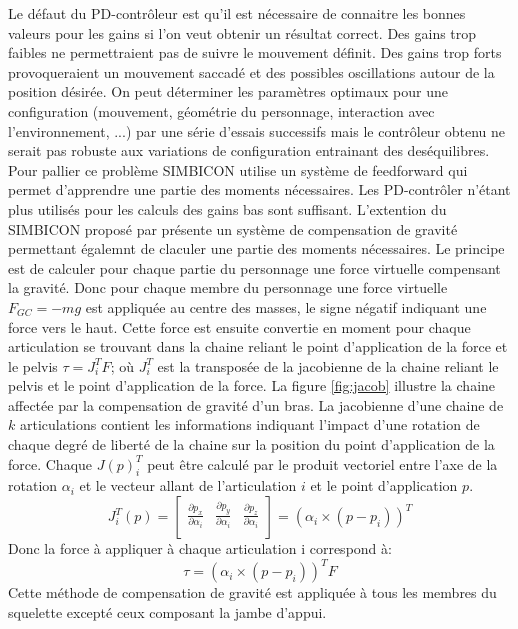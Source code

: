 \documentclass{llncs}
\begin{document}
Le défaut du PD-contrôleur est qu'il est nécessaire de connaitre les bonnes valeurs pour les gains si l'on veut obtenir un résultat correct. Des gains trop faibles ne permettraient pas de suivre le mouvement définit. Des gains trop forts provoqueraient un mouvement saccadé et des possibles oscillations autour de la position désirée. On peut déterminer les paramètres optimaux pour une configuration (mouvement, géométrie du personnage, interaction avec l'environnement, ...) par une série d'essais successifs mais le contrôleur obtenu ne serait pas robuste aux variations de configuration entrainant des deséquilibres. Pour pallier ce problème SIMBICON utilise un système de feedforward \cite{yin2007simbicon} qui permet d'apprendre une partie des moments nécessaires. Les PD-contrôler n'étant plus utilisés pour les calculs des gains bas sont suffisant. 
L'extention du SIMBICON proposé par \cite{coros2010generalized} présente un système de compensation de gravité permettant égalemnt de claculer une partie des moments nécessaires. Le principe est de calculer pour chaque partie du personnage une force virtuelle compensant la gravité. Donc pour chaque membre du personnage une force virtuelle \(F_{GC}=-mg\) est appliquée au centre des masses, le signe négatif indiquant une force vers le haut. Cette force est ensuite convertie en moment pour chaque articulation se trouvant dans la chaine reliant le point d'application de la force et le pelvis \(\tau=J_i^T F\); où \(J_i ^T\) est la transposée de la jacobienne de la chaine reliant le pelvis et le point d'application de la force. La figure \ref{fig:jacob} illustre la chaine affectée par la compensation de gravité d'un bras.
La jacobienne d'une chaine de \(k\) articulations contient les informations indiquant l'impact d'une rotation de chaque degré de liberté de la chaine sur la position du point d'application de la force. Chaque $J(p)_i ^T$ peut être calculé par le produit vectoriel entre l'axe de la rotation $\alpha_i$ et le vecteur allant de l'articulation \(i\) et le point d'application $p$.
\[
J_i ^T (p)=\begin{bmatrix}
\frac{\partial p_x}{\partial \alpha_i} & \frac{\partial p_y}{\partial \alpha_i} & \frac{\partial p_z}{\partial \alpha_i} \\
\end{bmatrix}
= (\alpha_i \times (p-p_i))^T
\]
Donc la force à appliquer à chaque articulation i correspond à:
\[
\tau = (\alpha_i \times (p-p_i))^T F
\]
Cette méthode de compensation de gravité est appliquée à tous les membres du squelette excepté ceux composant la jambe d'appui.
\end{document}
